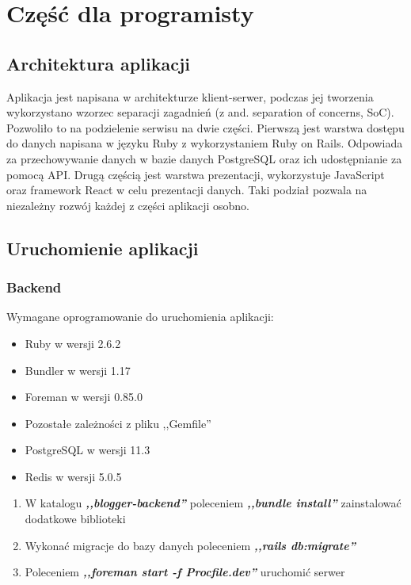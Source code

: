 \documentclass[declaration,shortabstract]{iithesis}
\begin{document}
\chapter{Część dla programisty}
\section{Architektura aplikacji}
Aplikacja jest napisana w architekturze klient-serwer, podczas jej tworzenia wykorzystano wzorzec separacji  zagadnień (z and. separation of concerns, SoC). Pozwoliło to na podzielenie serwisu na dwie części. Pierwszą jest warstwa dostępu do danych napisana w języku Ruby z wykorzystaniem Ruby on Rails. Odpowiada za przechowywanie danych w bazie danych PostgreSQL oraz ich udostępnianie za pomocą API. Drugą częścią jest warstwa prezentacji, wykorzystuje JavaScript oraz framework React w celu prezentacji danych. Taki podział pozwala na niezależny rozwój każdej z części aplikacji osobno.

\section{Uruchomienie aplikacji}

\subsection{Backend}
Wymagane oprogramowanie do uruchomienia aplikacji:
        \begin{itemize}
            \item Ruby w wersji 2.6.2
            \item Bundler w wersji 1.17
            \item Foreman w wersji 0.85.0
            \item Pozostałe zależności z pliku ,,Gemfile''
            \item PostgreSQL w wersji 11.3
            \item Redis w wersji 5.0.5
        \end{itemize}

\begin{enumerate}
    \item W katalogu \textbf{\textit{,,blogger-backend''}} poleceniem \textbf{\textit{,,bundle install''}} zainstalować dodatkowe biblioteki
    \item Wykonać migracje do bazy danych poleceniem \textbf{\textit{,,rails db:migrate''}}
    \item Poleceniem \textbf{\textit{,,foreman start -f Procfile.dev''}} uruchomić serwer
\end{enumerate}
\end{document}
